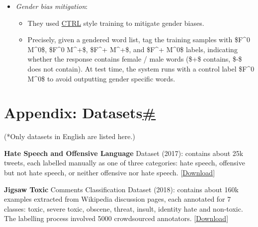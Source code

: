 \begin{itemize}
  \begin{itemize}
  \tightlist
  \item
    In order to avoid sensitive topics (politics, religion, drug use, medical advice, and NSFW and relationships/dating), they trained a multi-class classifier to detect those topics using crowdsourced lists of subreddits. The classifier can be periodically re-trained to capture the changes within topics over time.
  \item
    A small validation set is collected by recruiting crowdsourced workers to discuss one of the target topics.
  \end{itemize}
\item
  \emph{Gender bias mitigation}:

  \begin{itemize}
  \tightlist
  \item
    They used \href{https://arxiv.org/abs/1909.05858}{CTRL} style training to mitigate gender biases.
  \item
    Precisely, given a gendered word list, tag the training samples with \$F\^{}0 M\^{}0\$, \$F\^{}0 M\^{}+\$, \$F\^{}+ M\^{}+\$, and \$F\^{}+ M\^{}0\$ labels, indicating whether the response contains female / male words (\$+\$ contains, \$-\$ does not contain). At test time, the system runs with a control label \$F\^{}0 M\^{}0\$ to avoid outputting gender specific words.
  \end{itemize}
\end{itemize}

\section{\texorpdfstring{Appendix: Datasets\hyperref[appendix-datasets]{\#}}{Appendix: Datasets\#}}\label{appendix-datasets}

(*Only datasets in English are listed here.)

\textbf{Hate Speech and Offensive Language} Dataset (2017): contains about 25k tweets, each labelled manually as one of three categories: hate speech, offensive but not hate speech, or neither offensive nor hate speech. {[}\href{https://github.com/t-davidson/hate-speech-and-offensive-language/blob/master/data/readme.md}{Download}{]}

\label{jigsaw}{}\textbf{Jigsaw Toxic} Comments Classification Dataset (2018): contains about 160k examples extracted from Wikipedia discussion pages, each annotated for 7 classes: toxic, severe toxic, obscene, threat, insult, identity hate and non-toxic. The labelling process involved 5000 crowdsourced annotators. {[}\href{https://www.kaggle.com/c/jigsaw-toxic-comment-classification-challenge}{Download}{]}

